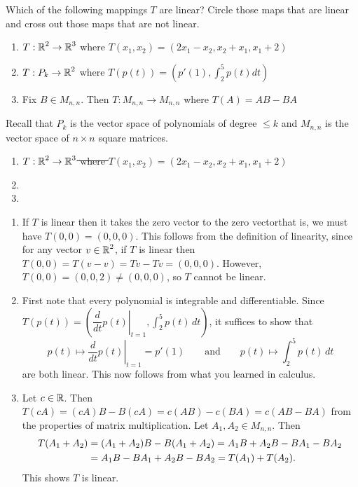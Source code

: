 \documentclass{ximera}
\author{Matthew Carr}
\begin{document}

\begin{exercise}\label{mc.exercise9}

Which of the following mappings $T$ are linear?  Circle those maps that are linear and cross out those maps that are not linear.

\begin{enumerate}
\item $T:\mbox{$\Bbb{R}$}^2\to\mbox{$\Bbb{R}$}^3$ where $T(x_1,x_2) = (2x_1 - x_2, x_2 + x_1, x_1 + 2)$
\item $T:P_k\to\mbox{$\Bbb{R}$}^2$ where $T(p(t)) = (p'(1), \int_2^5p(t)dt)$
\item Fix $B\in M_{n,n}$. Then $T:M_{n,n}\to M_{n,n}$ where $T(A) = AB-BA$
\end{enumerate}
Recall that $P_k$ is the vector space of polynomials of degree $\leq k$ and $M_{n,n}$ is the vector space of $n\times n$ square matrices. 
 
  
\begin{solution}

\ans \begin{enumerate}
\item \sout{$T:\mbox{$\Bbb{R}$}^2\to\mbox{$\Bbb{R}$}^3$ where $T(x_1,x_2) = (2x_1 - x_2, x_2 + x_1, x_1 + 2)$}
\item {}
\item {}
\end{enumerate}


\soln  
\begin{enumerate}
\item If $T$ is linear then it takes the zero vector to the zero vector\textemdash that is, we must have $T(0,0)=(0,0,0)$. This follows from the definition of linearity, since for any vector $v\in\mbox{$\Bbb{R}$}^2$, if $T$ is linear then $T(0,0)=T(v-v)= Tv-Tv=(0,0,0)$. However, $T(0,0)=(0,0,2)\ne (0,0,0)$, so $T$ cannot be linear.
\item First note that every polynomial is integrable and differentiable. Since $T(p(t))=\left(\left.\dfrac{d}{dt}p(t)\right|_{t=1},\int_{2}^{5}p(t)\,dt\right)$, it suffices to show that 
\[
p(t)\mapsto \left.\dfrac{d}{dt}p(t)\right|_{t=1}=p'(1)\qquad\text{and}\qquad p(t)\mapsto \int_{2}^{5}p(t)\,dt
\]
are both linear. This now follows from what you learned in calculus. 
\item Let $c\in\mbox{$\Bbb{R}$}$. Then $T(cA)=(cA)B-B(cA)=c(AB)-c(BA)=c(AB-BA)$ from the properties of matrix multiplication. Let $A_1,A_2\in M_{n,n}$. Then 
\begin{align*}
T(A_1+A_2)&=(A_1+A_2)B-B(A_1+A_2)=A_1 B+A_2 B-B A_1-BA_2\\
&=A_1 B-BA_1+A_2B-BA_2=T(A_1)+T(A_2)\ldotp
\end{align*}
This shows $T$ is linear.
\end{enumerate}

\end{solution}
\end{exercise}
\end{document}
